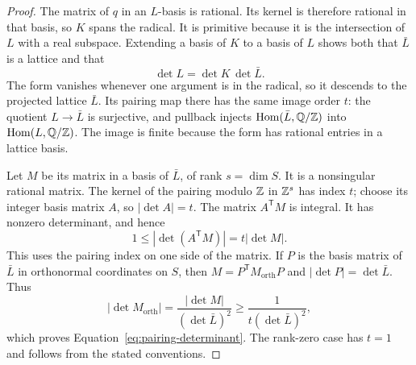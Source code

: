 \begin{proof}
The matrix of \(q\) in an \(L\)-basis is rational. Its kernel is
therefore rational in that basis, so \(K\) spans the radical.
It is primitive because it is the intersection of \(L\) with a
real subspace. Extending a basis of \(K\) to a basis of \(L\)
shows both that \(\bar L\) is a lattice and that
\[
 \det L=\det K\,\det\bar L.
\]
The form vanishes whenever one argument is in the radical, so it
descends to the projected lattice \(\bar L\). Its pairing map
there has the same image order \(t\): the quotient \(L\to\bar L\)
is surjective, and pullback injects
\(\operatorname{Hom}(\bar L,\mathbb Q/\mathbb Z)\) into \(\operatorname{Hom}(L,\mathbb Q/\mathbb Z)\).
The image is finite because the form has rational entries in a
lattice basis.

Let \(M\) be its matrix in a basis of \(\bar L\), of rank
\(s=\dim S\). It is a nonsingular rational matrix. The kernel of
the pairing modulo \(\mathbb Z\) in \(\mathbb Z^s\) has index \(t\); choose its
integer basis matrix \(A\), so \(|\det A|=t\).
The matrix \(A^{\mathsf T}M\) is integral. It has nonzero
determinant, and hence
\[
 1\le |\det(A^{\mathsf T}M)|=t|\det M|.
\]
This uses the pairing index on one side of the matrix. If \(P\)
is the basis matrix of \(\bar L\) in orthonormal coordinates on
\(S\), then \(M=P^{\mathsf T}M_{\mathrm{orth}}P\) and
\(|\det P|=\det\bar L\). Thus
\[
 |\det M_{\mathrm{orth}}|
 =\frac{|\det M|}{(\det\bar L)^2}
 \ge\frac{1}{t(\det\bar L)^2},
\]
which proves Equation~\eqref{eq:pairing-determinant}. The rank-zero
case has \(t=1\) and follows from the stated conventions.
\end{proof}

